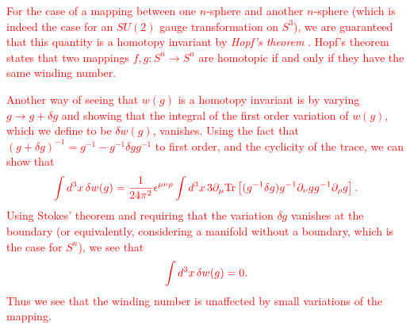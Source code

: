     \textcolor{red}{For the case of a mapping between one $n$-sphere and another $n$-sphere (which is indeed the case  for an $SU(2)$ gauge transformation on $S^3$), we are guaranteed that this quantity is a homotopy invariant by \textit{Hopf's theorem} \cite{Dugundji}. Hopf's theorem states that two mappings $f,g: S^n \rightarrow S^n$ are homotopic if and only if they have the same winding number.}

    \textcolor{red}{Another way of seeing that $w(g)$ is a homotopy invariant is by varying $g\rightarrow g+\delta g$ and showing that the integral of the first order variation of $w(g)$, which we define to be $\delta w(g)$, vanishes. Using the fact that $(g+\delta g)^{-1} = g^{-1} - g^{-1} \delta g g^{-1}$ to first order\textcolor{red}{,} and the cyclicity of the trace, we can show that}
\begin{align}
    \textcolor{red}{   \int d^3x \, \delta w(g) = \frac{1}{24 \pi^2} \epsilon^{\mu \nu \rho} \int d^3 x \, 3 \partial_{\mu}\mathrm{Tr} \left[(g^{-1} \delta g) g^{-1} \partial_{\nu} g g^{-1} \partial_{\rho} g \right].}
\end{align}
\textcolor{red}{Using Stokes' theorem and requiring that the variation $\delta g$ vanishes at the boundary (or equivalently, considering a manifold without a boundary, which is the case for $S^n$), we see that}
\begin{align}
    \textcolor{red}{ \int d^3 x \, \delta w(g) =0.}
\end{align}
\textcolor{red}{Thus we see that the winding number is unaffected by small variations of the mapping.}

